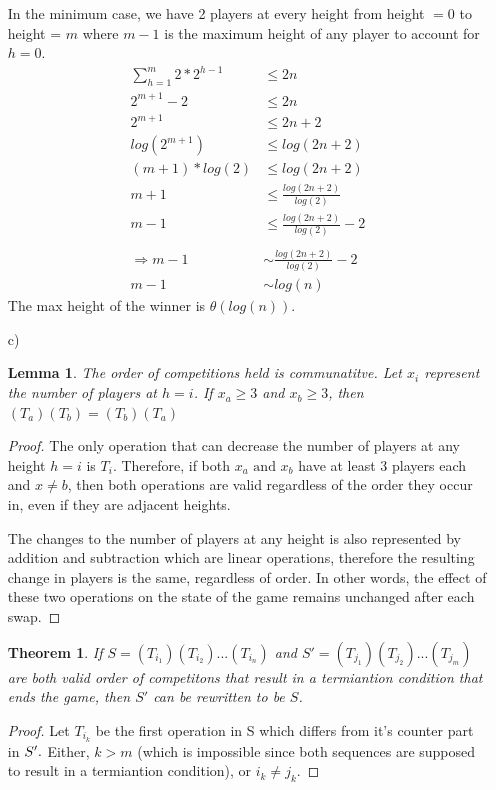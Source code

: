 \documentclass[12pt]{article}
\newtheorem{theorem}{Theorem}
\newtheorem{lemma}{Lemma}
\newcommand{\nextline}{\\[0.2em]}
\newcommand{\tand}{\text{ and }}
\begin{document}
\begin{itemize}
    In the minimum case, we have 2 players at every height from height $= 0$ to height = $m$ where $m-1$ is the maximum height of any player to account for $h=0$.
    \begin{align*}
    \sum_{h=1}^m 2*2^{h-1} &\leq 2n \\
    2^{m+1} - 2 &\leq 2n \\
    2^{m+1} &\leq 2n + 2 \\
    log(2^{m+1}) &\leq log(2n + 2) \\
    (m+1) * log(2) &\leq log(2n + 2) \\
    m+1 &\leq \frac{log(2n + 2)}{log(2)} \\
    m-1 &\leq \frac{log(2n + 2)}{log(2)} - 2\\\\
    \Rightarrow m - 1 &\sim \frac{log(2n + 2)}{log(2)} - 2 \\
    m - 1 &\sim log(n)
    \end{align*}
    The max height of the winner is $\theta(log(n))$.
    
    
    \item[c)]
    \begin{lemma}
        The order of competitions held is communatitve. Let $x_i$ represent the number of players at $h = i$. If $x_a \geq 3$ and $x_b \geq 3$, then $(T_a)(T_b) = (T_b)(T_a)$
    \end{lemma}
    \begin{proof}
        The only operation that can decrease the number of players at any height $h = i$ is $T_i$. Therefore, if both $x_a \tand x_b$ have at least 3 players each and $x \neq b$, then both operations are valid regardless of the order they occur in, even if they are adjacent heights.

        The changes to the number of players at any height is also represented by addition and subtraction which are linear operations, therefore the resulting change in players is the same, regardless of order. In other words, the effect of these two operations on the state of the game remains unchanged after each swap.
    \end{proof}

    \begin{theorem}
        If $S = (T_{i_1})(T_{i_2})...(T_{i_n})$ and $S' = (T_{j_1})(T_{j_2})...(T_{j_m})$ are both valid order of competitons that result in a termiantion condition that ends the game, then $S'$ can be rewritten to be $S$.
    \end{theorem}
    \begin{proof}
        Let $T_{i_k}$ be the first operation in S which differs from it's counter part in $S'. \nextline$ 
        Either, $k > m$ (which is impossible since both sequences are supposed to result in a termiantion condition), or $i_k \neq j_k$.


\end{proof}
\end{itemize}
\end{document}
